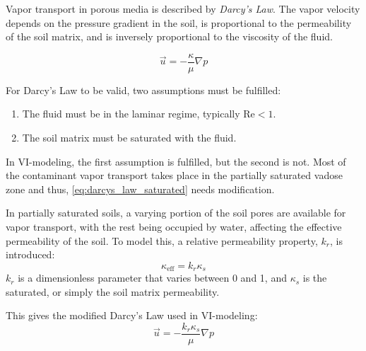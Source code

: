 Vapor transport in porous media is described by \textit{Darcy's Law}.
The vapor velocity depends on the pressure gradient in the soil, is proportional to the permeability of the soil matrix, and is inversely proportional to the viscosity of the fluid.

\begin{equation}\label{eq:darcys_law_saturated}
  \vec{u} = -\frac{\kappa}{\mu}\nabla p
\end{equation}

For Darcy's Law to be valid, two assumptions must be fulfilled:
\begin{enumerate}
  \item The fluid must be in the laminar regime, typically $\mathrm{Re} < 1$.
  \item The soil matrix must be saturated with the fluid.
\end{enumerate}
In VI-modeling, the first assumption is fulfilled, but the second is not.
Most of the contaminant vapor transport takes place in the partially saturated vadose zone and thus, \eqref{eq:darcys_law_saturated} needs modification.

In partially saturated soils, a varying portion of the soil pores are available for vapor transport, with the rest being occupied by water, affecting the effective permeability of the soil.
To model this, a relative permeability property, $k_r$, is introduced:
\begin{equation}
  \kappa_\mathrm{eff} = k_r \kappa_s
\end{equation}
$k_r$ is a dimensionless parameter that varies between 0 and 1, and $\kappa_s$ is the saturated, or simply the soil matrix permeability.

This gives the modified Darcy's Law used in VI-modeling:
\begin{equation}\label{eq:darcys_law}
  \vec{u} = -\frac{k_r \kappa_s}{\mu}\nabla p
\end{equation}
